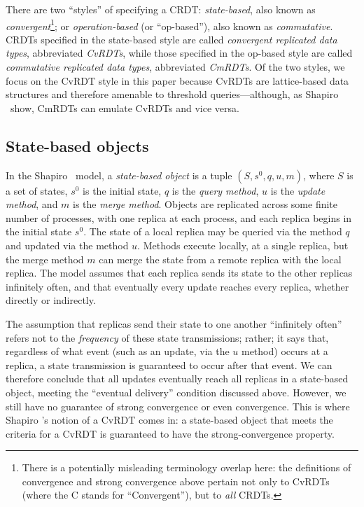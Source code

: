 There are two ``styles'' of specifying a CRDT: \emph{state-based},
also known as \emph{convergent}\footnote{There is a potentially
  misleading terminology overlap here: the definitions of convergence
  and strong convergence above pertain not only to CvRDTs (where the C
  stands for ``Convergent''), but to \emph{all} CRDTs.}; or
\emph{operation-based} (or ``op-based''), also known as
\emph{commutative}.  CRDTs specified in the state-based style are
called \emph{convergent replicated data types}, abbreviated
\emph{CvRDTs}, while those specified in the op-based style are called
\emph{commutative replicated data types}, abbreviated \emph{CmRDTs}.
Of the two styles, we focus on the CvRDT style in this paper because
CvRDTs are lattice-based data structures and therefore amenable to
threshold queries---although, as Shapiro \etal~show, CmRDTs can
emulate CvRDTs and vice versa.

\subsection{State-based objects}

In the Shapiro \etal~model, a \emph{state-based object} is a tuple
$(S, s^0, q, u, m)$, where $S$ is a set of states, $s^0$ is the
initial state, $q$ is the \emph{query method}, $u$ is the \emph{update
  method}, and $m$ is the \emph{merge method}.  Objects are replicated
across some finite number of processes, with one replica at each
process, and each replica begins in the initial state $s^0$.  The
state of a local replica may be queried via the method $q$ and updated
via the method $u$.  Methods execute locally, at a single replica, but
the merge method $m$ can merge the state from a remote replica with
the local replica.  The model assumes that each replica sends its
state to the other replicas infinitely often, and that eventually
every update reaches every replica, whether directly or indirectly.

The assumption that replicas send their state to one another
``infinitely often'' refers not to the \emph{frequency} of these state
transmissions; rather; it says that, regardless of what event (such as
an update, via the $u$ method) occurs at a replica, a state
transmission is guaranteed to occur after that event.  We can
therefore conclude that all updates eventually reach all replicas in a
state-based object, meeting the ``eventual delivery'' condition
discussed above.  However, we still have no guarantee of strong
convergence or even convergence.  This is where Shapiro \etal's notion
of a CvRDT comes in: a state-based object that meets the criteria for
a CvRDT is guaranteed to have the strong-convergence property.


